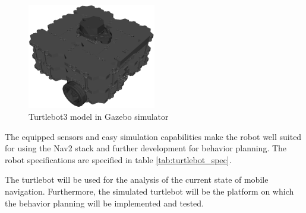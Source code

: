 \begin{figure}[ht]
	\centering
	\includegraphics[width=0.5\textwidth]{images/turtlebot_sim.png}
	\caption{Turtlebot3 model in Gazebo simulator}
	\label{fig:turtlebot}
\end{figure}

The equipped sensors and easy simulation capabilities make the robot well suited for using the Nav2 stack and further development for behavior planning. The robot specifications are specified in table \ref{tab:turtlebot_spec}. 

\begin{table}[ht]
	\centering
	\caption{Turtlebot3 Specifications}
	\label{tab:turtlebot_spec}
	\renewcommand{\arraystretch}{1.5}
\end{table}

The turtlebot will be used for the analysis of the current state of mobile navigation. Furthermore, the simulated turtlebot will be the platform on which the behavior planning will be implemented and tested.

